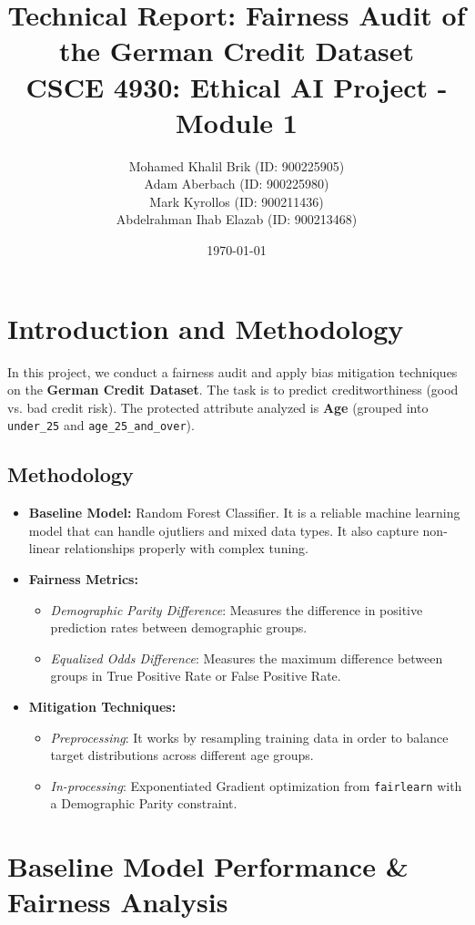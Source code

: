 \documentclass[12pt,a4paper]{article}
\title{Technical Report: Fairness Audit of the German Credit Dataset \\ \large CSCE 4930: Ethical AI Project - Module 1}
\author{
    Mohamed Khalil Brik (ID: 900225905) \\
    Adam Aberbach (ID: 900225980) \\
    Mark Kyrollos (ID: 900211436) \\
    Abdelrahman Ihab Elazab (ID: 900213468)
}
\date{\today}
\begin{document}
\maketitle

\section{Introduction and Methodology}
In this project, we conduct a fairness audit and apply bias mitigation techniques on the \textbf{German Credit Dataset}. The task is to predict creditworthiness (good vs. bad credit risk). The protected attribute analyzed is \textbf{Age} (grouped into \texttt{under\_25} and \texttt{age\_25\_and\_over}).

\subsection*{Methodology}
\begin{itemize}
    \item \textbf{Baseline Model:} Random Forest Classifier. It is a reliable machine learning model that can handle ojutliers and mixed data types. It also capture non-linear relationships properly with complex tuning.
    \item \textbf{Fairness Metrics:} 
    \begin{itemize}
        \item \textit{Demographic Parity Difference}: Measures the difference in positive prediction rates between demographic groups.
        \item \textit{Equalized Odds Difference}: Measures the maximum difference between groups in True Positive Rate or False Positive Rate.
    \end{itemize}
    \item \textbf{Mitigation Techniques:}
    \begin{itemize}
        \item \textit{Preprocessing}: It works by resampling training data in order to balance target distributions across different age groups.
        \item \textit{In-processing}: Exponentiated Gradient optimization from \texttt{fairlearn} with a Demographic Parity constraint.
    \end{itemize}
\end{itemize}

\section{Baseline Model Performance \& Fairness Analysis}
\end{document}
